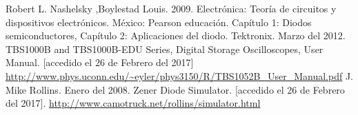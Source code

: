 \documentclass[twoside,twocolumn,a4paper]{article}
\begin{document}

\begin{thebibliography}{99} %

 Robert L. Nashelsky ,Boylestad Louis. 2009. Electr\'onica: Teor\'ia de circuitos y dispositivos electr\'onicos. M\'exico: Pearson educaci\'on. Cap\'itulo 1: Diodos semiconductores, Cap\'itulo 2: Aplicaciones del diodo.
 Tektronix. Marzo del 2012. TBS1000B and TBS1000B-EDU Series, Digital Storage Oscilloscopes, User Manual. [accedido el 26 de Febrero del 2017] \url{http://www.phys.uconn.edu/~eyler/phys3150/R/TBS1052B_User_Manual.pdf}
 J. Mike Rollins. Enero del 2008. Zener Diode Simulator. [accedido el 26 de Febrero del 2017]. \url{http://www.camotruck.net/rollins/simulator.html}
 
\end{thebibliography}

\end{document}
